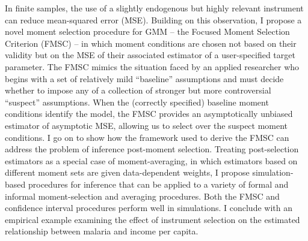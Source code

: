 In finite samples, the use of a slightly endogenous but highly relevant instrument can reduce mean-squared error (MSE). 
Building on this observation, I propose a novel moment selection procedure for GMM -- the Focused Moment Selection Criterion (FMSC) -- in which moment conditions are chosen not based on their validity but on the MSE of their associated estimator of a user-specified target parameter.
The FMSC mimics the situation faced by an applied researcher who begins with a set of relatively mild ``baseline'' assumptions and must decide whether to impose any of a collection of stronger but more controversial ``suspect'' assumptions.
When the (correctly specified) baseline moment conditions identify the model, the FMSC provides an asymptotically unbiased estimator of asymptotic MSE, allowing us to select over the suspect moment conditions.
I go on to show how the framework used to derive the FMSC can address the problem of inference post-moment selection.
Treating post-selection estimators as a special case of moment-averaging, in which estimators based on different moment sets are given data-dependent weights, I propose  simulation-based procedures for inference that can be applied to a variety of formal and informal moment-selection and averaging procedures.
Both the FMSC and confidence interval procedures perform well in simulations.
I conclude with an empirical example examining the effect of instrument selection on the estimated relationship between malaria and income per capita.
